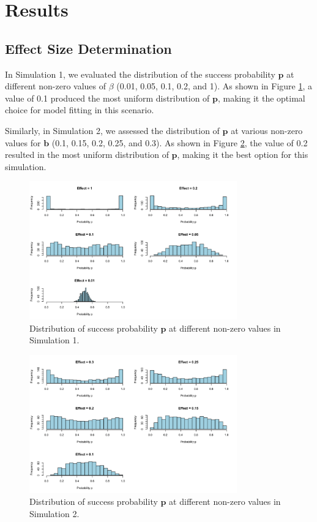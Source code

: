 \documentclass[12pt]{article}
\begin{document}
\section{Results}

\subsection{Effect Size Determination}

In Simulation 1, we evaluated the distribution of the success probability \( \mathbf{p} \) at different non-zero values of \( \beta \) (0.01, 0.05, 0.1, 0.2, and 1). As shown in Figure \ref{fig:sim1_p_dist}, a value of 0.1 produced the most uniform distribution of \( \mathbf{p} \), making it the optimal choice for model fitting in this scenario.

Similarly, in Simulation 2, we assessed the distribution of \( \mathbf{p} \) at various non-zero values for \( \mathbf{b} \) (0.1, 0.15, 0.2, 0.25, and 0.3). As shown in Figure \ref{fig:sim2_p_dist}, the value of 0.2 resulted in the most uniform distribution of \( \mathbf{p} \), making it the best option for this simulation.

\begin{figure}[h!]
	\centering
	\includegraphics[width=0.8\textwidth]{sim1_p_dist.png}
  \caption{Distribution of success probability \( \mathbf{p} \) at different non-zero values in Simulation 1.}
	\label{fig:sim1_p_dist}
\end{figure}

\begin{figure}[h!]
	\centering
	\includegraphics[width=0.8\textwidth]{sim2_p_dist.png}
  \caption{Distribution of success probability \( \mathbf{p} \) at different non-zero values in Simulation 2.}
	\label{fig:sim2_p_dist}
\end{figure}
\end{document}
